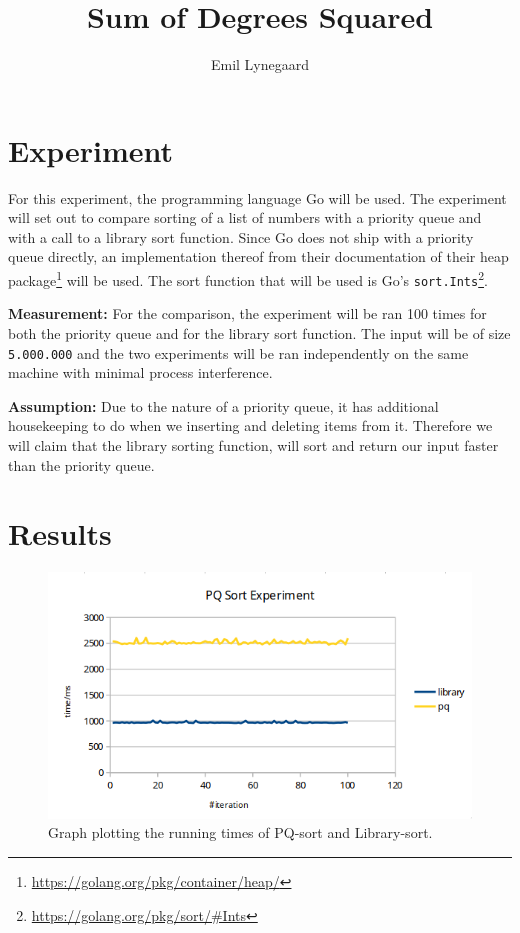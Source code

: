 \documentclass[a5paper]{article}
\title{Sum of Degrees Squared}
\author{Emil Lynegaard}
\begin{document}
  \maketitle
  \section{Experiment}
  For this experiment, the programming language Go will be used. The experiment will set out to compare sorting of a list of numbers with a priority queue and with a call to a library sort function. Since Go does not ship with a priority queue directly, an implementation thereof from their documentation of their heap package\footnote{\url{https://golang.org/pkg/container/heap/}} will be used. The sort function that will be used is Go's \texttt{sort.Ints}\footnote{\url{https://golang.org/pkg/sort/\#Ints}}.

\textbf{Measurement:} For the comparison, the experiment will be ran 100 times for both the priority queue and for the library sort function. The input will be of size \texttt{5.000.000} and the two experiments will be ran independently on the same machine with minimal process interference.

\textbf{Assumption:} Due to the nature of a priority queue, it has additional housekeeping to do when we inserting and deleting items from it. Therefore we will claim that the library sorting function, will sort and return our input faster than the priority queue.

\section{Results}
\begin{figure}[!ht]
    \centering
    \noindent\includegraphics[scale=0.6]{graph.png}
    \caption{Graph plotting the running times of PQ-sort and Library-sort.}
    \label{fig:graph}
\end{figure}
\end{document}
